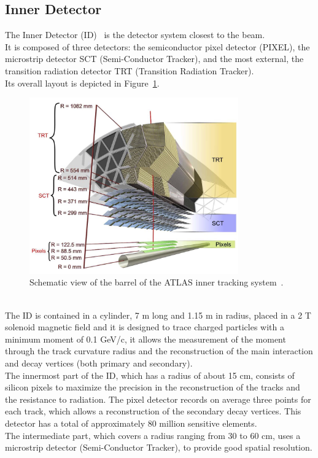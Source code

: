 \subsection{Inner Detector}
\label{sec:ID}
The Inner Detector (ID)~\cite{ATLAS} is the detector system closest to the beam.\\
It is composed of three detectors: the semiconductor pixel detector (PIXEL), the microstrip detector SCT (Semi-Conductor Tracker), and the most external, the transition radiation detector TRT (Transition Radiation 
Tracker).\\
Its overall layout is depicted in Figure~\ref{fig:ID}.
\begin{figure}[h]
	\centering
	\includegraphics[width=9cm]{Chapters/CH2/figures/ID}
	\caption{Schematic view of the barrel of the ATLAS inner tracking system~\cite{ATLAS}.}
	\label{fig:ID}
\end{figure}
\\The ID is contained in a cylinder, 7 m long and 1.15 m in radius, placed in a 2 T solenoid magnetic field and it is designed to trace charged particles with a minimum moment of 0.1 GeV/c, it allows the measurement of the moment through the track curvature radius and the reconstruction of the main interaction and decay vertices (both primary and secondary).\\
The innermost part of the ID, which has a radius of about 15 cm, consists of silicon pixels to maximize the precision in the reconstruction of the tracks and the resistance to radiation.
The pixel detector records on average three points for each track, which allows a reconstruction of the secondary decay vertices. This detector has a total of approximately 80 million sensitive elements.
\vspace{\baselineskip}
\\The intermediate part, which covers a radius ranging from 30 to 60 cm, uses a microstrip detector (Semi-Conductor Tracker), to provide good spatial resolution.
